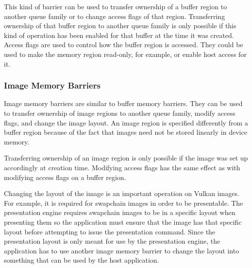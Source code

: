         This kind of barrier can be used to transfer ownership of a buffer region to another queue family or to change access flags of that region.
        Transferring ownership of that buffer region to another queue family is only possible if this kind of operation has been enabled for that buffer at the time it was created.
        Access flags are used to control how the buffer region is accessed.
        They could be used to make the memory region read-only, for example, or enable \gls{host} access for it.

      \subsubsection{Image Memory Barriers}
        Image memory barriers are similar to buffer memory barriers.
        They can be used to transfer ownership of image regions to another queue family, modify access flags, and change the image layout.
        An image region is specified differently from a buffer region because of the fact that images need not be stored linearly in \gls{device} memory.

        Transferring ownership of an image region is only possible if the image was set up accordingly at creation time.
        Modifying access flags has the same effect as with modifying access flags on a buffer region.

        Changing the layout of the image is an important operation on Vulkan images.
        For example, it is required for swapchain images in order to be presentable.
        The presentation engine requires swapchain images to be in a specific layout when presenting them so the \gls{application} must ensure that the image has that specific layout before attempting to issue the presentation command.
        Since the presentation layout is only meant for use by the presentation engine, the \gls{application} has to use another image memory barrier to change the layout into something that can be used by the \gls{host} \gls{application}.
